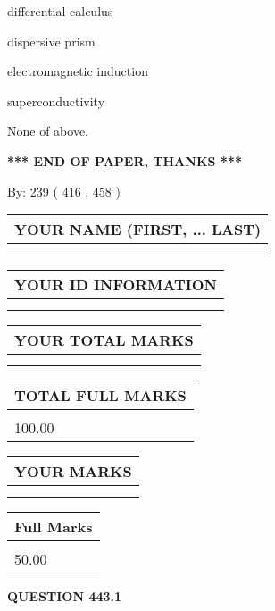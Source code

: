 \documentclass[12pt]{article}
\begin{document}
 
differential calculus
 
 
dispersive prism
 
 
electromagnetic induction
 
 
superconductivity
 
 
 None of above.
 
 
   
   
\vspace{1.0in} 
{\textbf{\large{ *** END OF PAPER, THANKS *** }}} 
   
   
\hspace{1.0in} By: 
 239 ( 416 ,  458 )
   
   
   
   
\newpage 
\setcounter{page}{ 
   443001 } 
   
   
   
   
\noindent\begin{tabular}{|l|}
\hline
YOUR NAME (FIRST, ... LAST)  \\
\hline
 \\ 
 \\ 
\hline
\end{tabular}
\hspace{0.05in} \begin{tabular}{|l|}
\hline
 YOUR   ID   INFORMATION  \\
\hline
 \\ 
 \\ 
\hline
\end{tabular}
   
   
\vspace{0.2in}\noindent\begin{tabular}{|l|}
\hline
YOUR TOTAL MARKS  \\
\hline
 \\ 
 \\ 
\hline
\end{tabular}
\hspace{0.05in} \begin{tabular}{|l|}
\hline
TOTAL FULL MARKS  \\
\hline
 \\ 
100.00 \\
\hline
\end{tabular}
  
\vspace{0.2in}
  
\noindent\begin{tabular}{|l|}
\hline
 YOUR MARKS  \\
\hline
 \\ 
 \\ 
\hline
\end{tabular}
\hspace{0.05in} \begin{tabular}{|l|}
\hline
 Full Marks  \\
\hline
 \\ 
50.00 \\
\hline
\end{tabular}
{\textbf{\Large{QUESTION
443.1 
}}}
  
\end{document}
